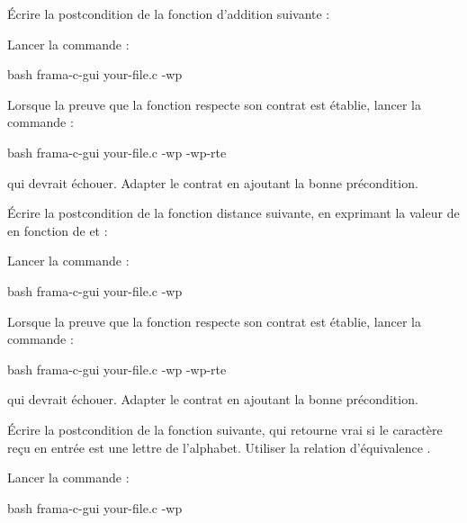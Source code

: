 

Écrire la postcondition de la fonction d'addition suivante :




Lancer la commande :

\begin{CodeBlock}{bash}
frama-c-gui your-file.c -wp
\end{CodeBlock}


Lorsque la preuve que la fonction respecte son contrat est établie, lancer
la commande :

\begin{CodeBlock}{bash}
frama-c-gui your-file.c -wp -wp-rte
\end{CodeBlock}


qui devrait échouer. Adapter le contrat en ajoutant la bonne précondition.




Écrire la postcondition de la fonction distance suivante, en exprimant
la valeur de  en fonction de  et
 :




Lancer la commande :


\begin{CodeBlock}{bash}
frama-c-gui your-file.c -wp
\end{CodeBlock}


Lorsque la preuve que la fonction respecte son contrat est établie, lancer
la commande :

\begin{CodeBlock}{bash}
frama-c-gui your-file.c -wp -wp-rte
\end{CodeBlock}


qui devrait échouer. Adapter le contrat en ajoutant la bonne précondition.




Écrire la postcondition de la fonction suivante, qui retourne vrai si le
caractère reçu en entrée est une lettre de l'alphabet. Utiliser la relation
d'équivalence  \CodeInline{<==>}.




Lancer la commande :


\begin{CodeBlock}{bash}
frama-c-gui your-file.c -wp
\end{CodeBlock}


